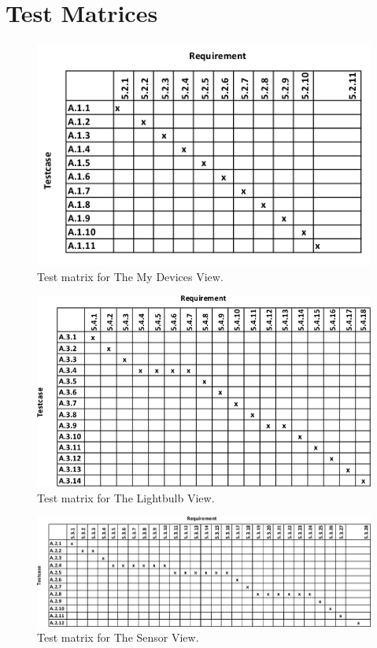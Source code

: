\documentclass[a4paper]{article}
\begin{document}
\newpage

\section{Test Matrices}
\begin{figure}[H]
    \centering
    \includegraphics[scale=0.9]{SVVS-pics/testmatrixMyDevices.png}
    \caption{Test matrix for The My Devices View.}
    \label{fig:testmatrix-mydevices}
\end{figure}

\begin{figure}[H]
    \centering
    \includegraphics[scale=0.9]{SVVS-pics/testmatrixLightbulb.png}
    \caption{Test matrix for The Lightbulb View.}
    \label{fig:testmatrix-lightbulb}
\end{figure}

\begin{figure}[H]
    \centering
    \includegraphics[scale=0.9,angle=-90]{SVVS-pics/testmatrixSensor.png}
    \caption{Test matrix for The Sensor View.}
    \label{fig:testmatrix-sensor}
\end{figure}
\end{document}
